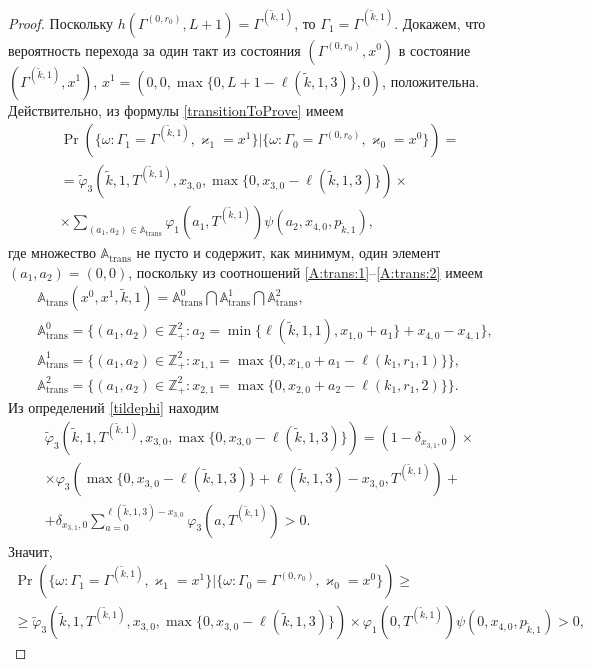 \documentclass[a4paper,12pt,russian]{extarticle}
\begin{document}
\begin{proof}
Поскольку $h(\Gamma^{(0,r_0)}, L+1) = \Gamma^{(\tilde{k},1)}$, то $\Gamma_1 = \Gamma^{(\tilde{k},1)}$. Докажем, что вероятность перехода за один такт из состояния $(\Gamma^{(0,r_0)},x^0)$ в состояние $(\Gamma^{(\tilde{k},1)},x^1)$, $x^1 = (0,0,\max{\{0,L+1-\ell(\tilde{k},1,3)\}},0)$, положительна.
Действительно, из формулы \eqref{transitionToProve} имеем
\begin{multline*}
\Pr(\{\omega\colon \Gamma_{1}=\Gamma^{(\tilde{k},1)}, \varkappa_{1}=x^1\}|\{\omega\colon 
\Gamma_{0}=\Gamma^{(0,r_0)}, \varkappa_{0}=x^0\})=\\
=\widetilde{\varphi}_3(\tilde{k},1,T^{(\tilde{k},1)},x_{3,0},\max{\{0,x_{3,0} - \ell(\tilde{k},1,3)\}}) \times \\ \times
\sum_{(a_1,a_2)\in {\mathbb A}_{\mathrm{trans}}}\varphi_1(a_1,T^{(\tilde{k},1)})  \psi(a_2,x_{4,0}, p_{\tilde{k},1}),
\end{multline*}
где множество ${\mathbb A}_{\mathrm{trans}}$ не пусто и содержит, как минимум, один элемент $(a_1,a_2)=(0,0)$, поскольку из соотношений \eqref{A:trans:1}--\eqref{A:trans:2} имеем
\begin{align*}
&{\mathbb A}_{\mathrm{trans}}(x^0,x^1,\tilde{k},1) = {\mathbb A}_{\mathrm{trans}}^0 \bigcap {\mathbb A}_{\mathrm{trans}}^1\bigcap {\mathbb A}_{\mathrm{trans}}^2,\\
&{\mathbb A}_{\mathrm{trans}}^0 = \{(a_1,a_2) \in \mathbb{Z}_+^2 \colon a_2 = \min{\{\ell(\tilde{k},1,1), x_{1,0}+a_1}\} +x_{4,0}- x_{4,1}\},\\
&{\mathbb A}_{\mathrm{trans}}^1 = \{(a_1,a_2) \in \mathbb{Z}_+^2 \colon x_{1,1}=\max{\{0,x_{1,0}+a_1-\ell(k_1,r_1,1)\}}\},\\
& {\mathbb A}_{\mathrm{trans}}^2 = \{(a_1,a_2) \in \mathbb{Z}_+^2 \colon  x_{2,1} =\max{\{0,x_{2,0}+a_2-\ell(k_1,r_1,2)\}}\}.
\end{align*}
Из определений \eqref{tildephi} находим
\begin{multline*}
\widetilde{\varphi}_3(\tilde{k},1,T^{(\tilde{k},1)},x_{3,0},\max{\{0,x_{3,0} - \ell(\tilde{k},1,3)\}})= (1-\delta_{x_{3,1},0}) \times \\\times\varphi_3(\max{\{0,x_{3,0} - \ell(\tilde{k},1,3)\}} + \ell (\tilde{k},1,3) - x_{3,0},T^{(\tilde{k},1)} ) 
+\\+\delta_{x_{3,1},0} \sum_{a=0}^{\ell(\tilde{k},1,3)-x_{3,0}}\varphi_3 (a,T^{(\tilde{k},1)})>0.
\end{multline*}
Значит,
\begin{multline*}
\Pr(\{\omega\colon \Gamma_{1}=\Gamma^{(\tilde{k},1)}, \varkappa_{1}=x^1\}|\{\omega\colon 
\Gamma_{0}=\Gamma^{(0,r_0)}, \varkappa_{0}=x^0\})\geqslant \\
\geqslant \widetilde{\varphi}_3(\tilde{k},1,T^{(\tilde{k},1)},x_{3,0},\max{\{0,x_{3,0} - \ell(\tilde{k},1,3)\}})
\times
\varphi_1(0,T^{(\tilde{k},1)})  \psi(0,x_{4,0}, p_{\tilde{k},1}) > 0,
\end{multline*}


\end{proof}
\end{document}
